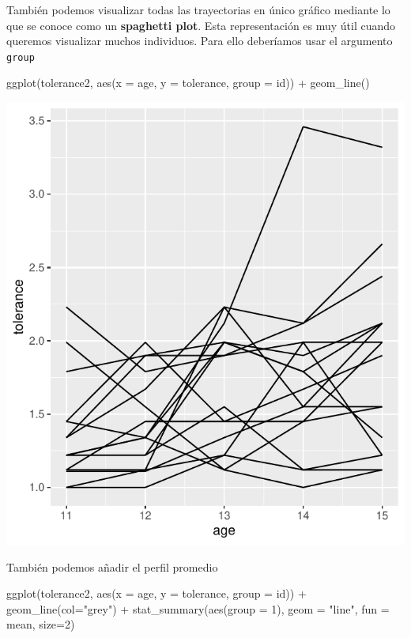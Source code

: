 \documentclass[
]{book}
\newenvironment{Shaded}{\begin{snugshade}}{\end{snugshade}}
\newcommand{\AttributeTok}[1]{\textcolor[rgb]{0.77,0.63,0.00}{#1}}
\newcommand{\DecValTok}[1]{\textcolor[rgb]{0.00,0.00,0.81}{#1}}
\newcommand{\FunctionTok}[1]{\textcolor[rgb]{0.00,0.00,0.00}{#1}}
\newcommand{\NormalTok}[1]{#1}
\newcommand{\SpecialCharTok}[1]{\textcolor[rgb]{0.00,0.00,0.00}{#1}}
\newcommand{\StringTok}[1]{\textcolor[rgb]{0.31,0.60,0.02}{#1}}
\begin{document}
También podemos visualizar todas las trayectorias en único gráfico mediante lo que se conoce como un \textbf{spaghetti plot}. Esta representación es muy útil cuando queremos visualizar muchos individuos. Para ello deberíamos usar el argumento \texttt{group}

\begin{Shaded}
\begin{Highlighting}[]
\FunctionTok{ggplot}\NormalTok{(tolerance2, }\FunctionTok{aes}\NormalTok{(}\AttributeTok{x =}\NormalTok{ age, }\AttributeTok{y =}\NormalTok{ tolerance, }\AttributeTok{group =}\NormalTok{ id)) }\SpecialCharTok{+}
  \FunctionTok{geom\_line}\NormalTok{()}
\end{Highlighting}
\end{Shaded}

\includegraphics{fig_out/unnamed-chunk-39-1.pdf}

También podemos añadir el perfil promedio

\begin{Shaded}
\begin{Highlighting}[]
\FunctionTok{ggplot}\NormalTok{(tolerance2, }\FunctionTok{aes}\NormalTok{(}\AttributeTok{x =}\NormalTok{ age, }\AttributeTok{y =}\NormalTok{ tolerance, }\AttributeTok{group =}\NormalTok{ id)) }\SpecialCharTok{+}
  \FunctionTok{geom\_line}\NormalTok{(}\AttributeTok{col=}\StringTok{"grey"}\NormalTok{) }\SpecialCharTok{+} 
  \FunctionTok{stat\_summary}\NormalTok{(}\FunctionTok{aes}\NormalTok{(}\AttributeTok{group =} \DecValTok{1}\NormalTok{), }\AttributeTok{geom =} \StringTok{"line"}\NormalTok{, }\AttributeTok{fun =}\NormalTok{ mean, }\AttributeTok{size=}\DecValTok{2}\NormalTok{)}
\end{Highlighting}
\end{Shaded}
\end{document}
